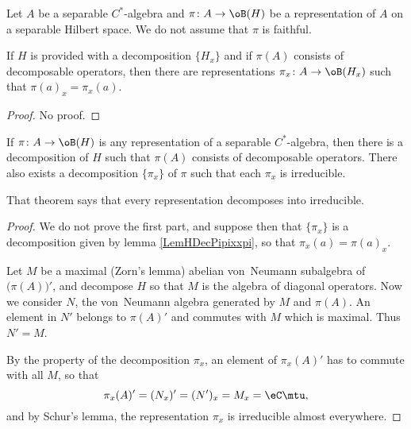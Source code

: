 Let $A$ be a separable $C^*$-algebra and $\pi\colon A\to \oB(H)$ be a representation of $A$ on a separable Hilbert space. We do not assume that $\pi$ is faithful.

\begin{lemma}		\label{LemHDecPipixxpi}
If $H$ is provided with a decomposition $\{ H_x \}$ and if $\pi(A)$ consists of decomposable operators, then there are representations $\pi_x\colon A\to \oB(H_x)$ such that $\pi(a)_x=\pi_x(a)$.
\end{lemma}

\begin{proof}
No proof.
\end{proof}

\begin{theorem}		\label{ThoRepDecSepIrrep}
	If $\pi\colon A\to \oB(H)$ is any representation of a separable $C^*$-algebra, then there is a decomposition of $H$ such that $\pi(A)$ consists of decomposable operators. There also exists a decomposition $\{ \pi_x \}$ of $\pi$ such that each $\pi_x$ is irreducible.
\end{theorem}

That theorem says that every representation decomposes into irreducible.

\begin{proof}

	We do not prove the first part, and suppose then that $\{ \pi_x \}$ is a decomposition given by lemma \ref{LemHDecPipixxpi}, so that $\pi_x(a)=\pi(a)_x$.

	Let $M$ be a maximal (Zorn's lemma) abelian von~Neumann subalgebra of $\big( \pi(A) \big)'$, and decompose $H$ so that $M$ is the algebra of diagonal operators. Now we consider $N$, the von~Neumann algebra generated by $M$ and $\pi(A)$. An element in $N'$ belongs to $\pi(A)'$ and commutes with $M$ which is maximal. Thus $N'=M$. 

	By the property of the decomposition $\pi_x$, an element of $\pi_x(A)'$ has to commute with all $M$, so that
	\begin{equation}
		\pi_x(A)'=(N_x)'=(N')_x=M_x=\eC\mtu,
	\end{equation}
	and by Schur's lemma, the representation $\pi_x$ is irreducible almost everywhere.
\end{proof}

